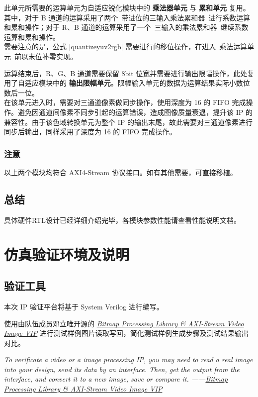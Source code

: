 \documentclass[12pt, a4paper, oneside]{ctexbook}
\begin{document}
	此单元所需要的运算单元为自适应锐化模块中的 \textbf{乘法器单元} 与 \textbf{累和单元} 复用。其中，对于 B 通道的运算采用了两个\ 带进位的三输入乘法累和器\ 进行系数运算和累和操作；对于 R、B 通道的运算采用了一个\ 三输入的乘法累和器\ 继续系数运算和累和操作。\\
	
	需要注意的是，公式 \ref{quantizeyuv2rgb} 需要进行的移位操作，在进入\ 乘法运算单元\ 前以末位补零实现。
	
	运算结束后，R、G、B 通道需要保留 8bit 位宽并需要进行输出限幅操作，此处复用了自适应模块中的 \textbf{输出限幅单元}。限幅输入单元的数据为运算结果实际小数位数后一位。\\
	
	在该单元进入时，需要对三通道像素做同步操作，使用深度为 16 的 FIFO 完成操作。避免因通道间像素不同步引起的运算错误，造成图像质量衰退，提升该 IP 的兼容性。由于该色域转换单元为整个 IP 的输出末尾，故此需要对三通道像素进行同步后输出，同样采用了深度为 16 的 FIFO 完成操作。
	
	\subsection{注意}
	以上两个模块均符合 AXI4-Stream 协议接口。如有其他需要，可直接移植。
	
	
	\section{总结}
	具体硬件RTL设计已经详细介绍完毕，各模块参数性能请查看性能说明文档。
	
	\chapter{仿真验证环境及说明}
	\section{验证工具}
	本次 IP 验证平台将基于 System Verilog 进行编写。\par 使用由队伍成员邓立唯开源的 \href{https://github.com/Aperture-Electronic/SystemVerilog-Bitmap-Library-AXI-Image-VIP}{\textit{Bitmap Processing Library \& AXI-Stream Video Image VIP}} 进行测试样例图片读取写回，简化测试样例生成步骤及测试结果输出对比。\par \par
	\emph{To verificate a video or a image processing IP, you may need to read a real image into your design, send its data by an interface. Then, get the output from the interface, and convert it to a new image, save or compare it. ——\href{https://github.com/Aperture-Electronic/SystemVerilog-Bitmap-Library-AXI-Image-VIP}{Bitmap Processing Library \& AXI-Stream Video Image VIP}} \\
	
\end{document}
